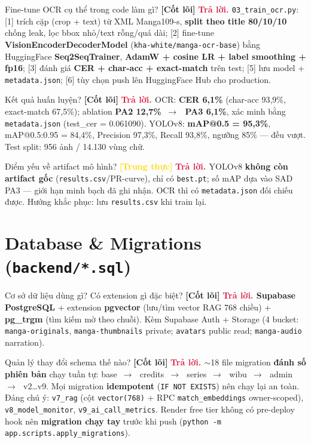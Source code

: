 \documentclass[11pt]{article}
\newcommand{\arr}{\,\ensuremath{\rightarrow}\,}
\newcommand{\code}[1]{\texttt{\small #1}}
\newcommand{\B}[1]{\textbf{#1}}
\newcommand{\tagCore}{\textcolor{steel}{\footnotesize\textbf{[Cốt lõi]}}}
\newcommand{\tagHonest}{\textcolor{gold}{\footnotesize\textbf{[Trung thực]}}}
\newcommand{\A}{\textbf{\textcolor{crimson}{Trả lời. }}}
\begin{document}
\begin{qa}{Fine-tune OCR cụ thể trong code làm gì? \tagCore}
\A \code{03\_train\_ocr.py}: [1] trích cặp (crop + text) từ XML Manga109-s, \B{split theo title 80/10/10} chống leak, lọc bbox nhỏ/text rỗng/quá dài; [2] fine-tune \B{VisionEncoderDecoderModel} (\code{kha-white/manga-ocr-base}) bằng HuggingFace \B{Seq2SeqTrainer}, \B{AdamW + cosine LR + label smoothing + fp16}; [3] đánh giá \B{CER + char-acc + exact-match} trên test; [5] lưu model + \code{metadata.json}; [6] tùy chọn push lên HuggingFace Hub cho production.
\end{qa}

\begin{qa}{Kết quả huấn luyện? \tagCore}
\A OCR: \B{CER 6,1\%} (char-acc 93,9\%, exact-match 67,5\%); ablation \B{PA2 12,7\% \arr\ PA3 6,1\%}, xác minh bằng \code{metadata.json} (test\_cer = 0.061090). YOLOv8: \B{mAP@0.5 = 95,3\%}, mAP@0.5:0.95 = 84,4\%, Precision 97,3\%, Recall 93,8\%, ngưỡng 85\% --- đều vượt. Test split: 956 ảnh / 14.130 vùng chữ.
\end{qa}

\begin{qa}{Điểm yếu về artifact mô hình? \tagHonest}
\A YOLOv8 \B{không còn artifact gốc} (\code{results.csv}/PR-curve), chỉ có \code{best.pt}; số mAP dựa vào SAD PA3 --- giới hạn minh bạch đã ghi nhận. OCR thì có \code{metadata.json} đối chiếu được. Hướng khắc phục: lưu \code{results.csv} khi train lại.
\end{qa}

\section{Database \& Migrations (\texttt{backend/*.sql})}

\begin{qa}{Cơ sở dữ liệu dùng gì? Có extension gì đặc biệt? \tagCore}
\A \B{Supabase PostgreSQL} + extension \B{pgvector} (lưu/tìm vector RAG 768 chiều) + \B{pg\_trgm} (tìm kiếm mờ theo chuỗi). Kèm Supabase Auth + Storage (4 bucket: \code{manga-originals}, \code{manga-thumbnails} private; \code{avatars} public read; \code{manga-audio} narration).
\end{qa}

\begin{qa}{Quản lý thay đổi schema thế nào? \tagCore}
\A $\sim$18 file migration \B{đánh số phiên bản} chạy tuần tự: base \arr\ credits \arr\ series \arr\ wibu \arr\ admin \arr\ v2\ldots v9. Mọi migration \B{idempotent} (\code{IF NOT EXISTS}) nên chạy lại an toàn. Đáng chú ý: \code{v7\_rag} (cột \code{vector(768)} + RPC \code{match\_embeddings} owner-scoped), \code{v8\_model\_monitor}, \code{v9\_ai\_call\_metrics}. Render free tier không có pre-deploy hook nên \B{migration chạy tay} trước khi push (\code{python -m app.scripts.apply\_migrations}).
\end{qa}
\end{document}
